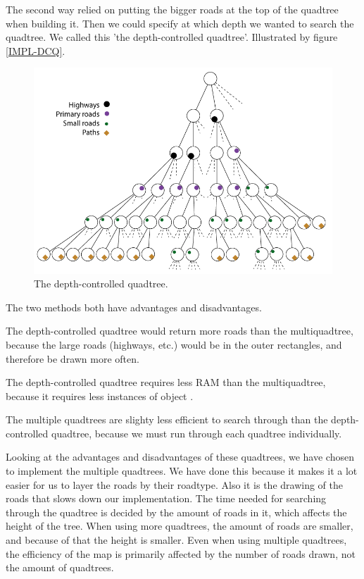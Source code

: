 The second way relied on putting the bigger roads at the top of the
quadtree when building it. Then we could specify at which depth we wanted to
search the quadtree. We called this 'the depth-controlled quadtree'. Illustrated
by figure \ref{IMPL-DCQ}.

\begin{figure}[h!]
\centering
\includegraphics[width=1\linewidth]{images/DepthcontrolledQuadtree.png}
\caption{The depth-controlled quadtree.}
\label{IMPL-DCDQ}
\end{figure}

The two methods both have advantages and disadvantages.

The depth-controlled quadtree would return more roads than the multiquadtree,
because the large roads (highways, etc.) would be in the outer rectangles, and
therefore be drawn more often.

The depth-controlled quadtree requires less RAM than the multiquadtree,
because it requires less instances of object .

The multiple quadtrees are slighty less efficient to search through than the
depth-controlled quadtree, because we must run through each quadtree
individually.

Looking at the advantages and disadvantages of these quadtrees, we have chosen
to implement the multiple quadtrees. We have done this because it makes it a lot
easier for us to layer the roads by their roadtype. Also it is the drawing of
the roads that slows down our implementation. The time needed for searching
through the quadtree is decided by the amount of roads in it, which affects the
height of the tree. When using more quadtrees, the amount of roads are smaller,
and because of that the height is smaller. Even when using multiple quadtrees,
the efficiency of the map is primarily affected by the number of roads drawn,
not the amount of quadtrees.

